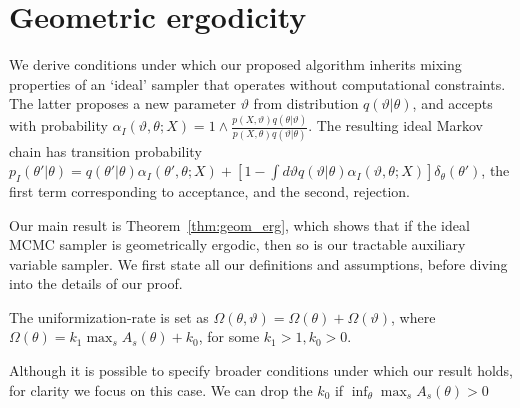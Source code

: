 \section{Geometric ergodicity}
We derive conditions under which our proposed algorithm
inherits mixing properties of an `ideal' sampler that operates without
computational constraints. The latter proposes a new parameter $\vartheta$
from distribution $q(\vartheta|\theta)$, and accepts with probability
$\alpha_I(\vartheta,\theta; X) = 1 \wedge \frac{p(X , \vartheta)q(\theta| \vartheta)}
      {p(X , \theta)q(\vartheta|\theta)}$.  The resulting ideal
Markov chain has transition probability
$p_I(\theta'|\theta) = q(\theta'|\theta)\alpha_I(\theta',\theta;X) + \left[1-\int d\vartheta
q(\vartheta|\theta)\alpha_I(\vartheta,\theta;X)\right]\delta_\theta(\theta')$, the first
term corresponding to acceptance, and the second, rejection.

Our main result is Theorem~\ref{thm:geom_erg}, which shows that if the ideal MCMC
sampler is geometrically ergodic, then so is our tractable auxiliary
variable sampler. 
We first state all our definitions and assumptions, before diving into the details
of our proof.
\begin{assumption}
The uniformization-rate is set as $\Omega(\theta, \vartheta) = \Omega(\theta) + 
\Omega(\vartheta)$, where %
$\Omega(\theta) = k_1 \max_s A_{s}(\theta) + k_0$, for some 
$k_1 > 1, k_0 > 0$.
\label{asmp:unif_rate}
\end{assumption}
Although it is possible to specify broader conditions under which our 
result holds, for clarity we focus on this case. 
We can drop the $k_0$ if $\inf_\theta \max_s A_s(\theta) > 0$

